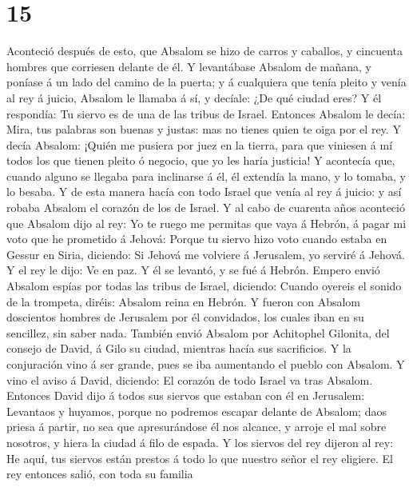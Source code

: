 \hypertarget{section-14}{%
\section{15}\label{section-14}}

 Aconteció después de esto, que Absalom se hizo de carros y
caballos, y cincuenta hombres que corriesen delante de él. 
Y levantábase Absalom de mañana, y poníase á un lado del camino de la
puerta; y á cualquiera que tenía pleito y venía al rey á juicio, Absalom
le llamaba á sí, y decíale: ¿De qué ciudad eres? Y él respondía: Tu
siervo es de una de las tribus de Israel.  Entonces Absalom
le decía: Mira, tus palabras son buenas y justas: mas no tienes quien te
oiga por el rey.  Y decía Absalom: ¡Quién me pusiera por
juez en la tierra, para que viniesen á mí todos los que tienen pleito ó
negocio, que yo les haría justicia!  Y acontecía que, cuando
alguno se llegaba para inclinarse á él, él extendía la mano, y lo
tomaba, y lo besaba.  Y de esta manera hacía con todo Israel
que venía al rey á juicio: y así robaba Absalom el corazón de los de
Israel.  Y al cabo de cuarenta años aconteció que Absalom
dijo al rey: Yo te ruego me permitas que vaya á Hebrón, á pagar mi voto
que he prometido á Jehová:  Porque tu siervo hizo voto
cuando estaba en Gessur en Siria, diciendo: Si Jehová me volviere á
Jerusalem, yo serviré á Jehová.  Y el rey le dijo: Ve en
paz. Y él se levantó, y se fué á Hebrón.  Empero envió
Absalom espías por todas las tribus de Israel, diciendo: Cuando oyereis
el sonido de la trompeta, diréis: Absalom reina en Hebrón. 
Y fueron con Absalom doscientos hombres de Jerusalem por él convidados,
los cuales iban en su sencillez, sin saber nada.  También
envió Absalom por Achitophel Gilonita, del consejo de David, á Gilo su
ciudad, mientras hacía sus sacrificios. Y la conjuración vino á ser
grande, pues se iba aumentando el pueblo con Absalom.  Y
vino el aviso á David, diciendo: El corazón de todo Israel va tras
Absalom.  Entonces David dijo á todos sus siervos que
estaban con él en Jerusalem: Levantaos y huyamos, porque no podremos
escapar delante de Absalom; daos priesa á partir, no sea que
apresurándose él nos alcance, y arroje el mal sobre nosotros, y hiera la
ciudad á filo de espada.  Y los siervos del rey dijeron al
rey: He aquí, tus siervos están prestos á todo lo que nuestro señor el
rey eligiere.  El rey entonces salió, con toda su familia
